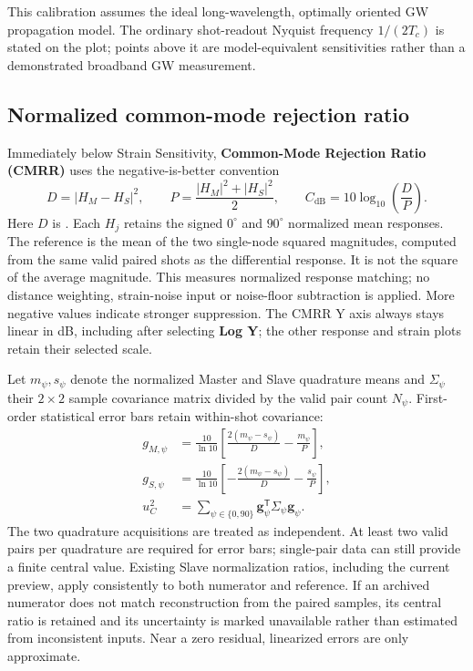 \documentclass[11pt,oneside,openany]{book}
\newcommand{\code}[1]{\texttt{\detokenize{#1}}}
\newcommand{\ui}[1]{\textbf{#1}}
\begin{document}
This calibration assumes the ideal long-wavelength, optimally oriented GW propagation
model. The ordinary shot-readout Nyquist frequency $1/(2T_c)$ is stated on the plot;
points above it are model-equivalent sensitivities rather than a demonstrated broadband
GW measurement.

\subsection{Normalized common-mode rejection ratio}
Immediately below Strain Sensitivity, \ui{Common-Mode Rejection Ratio (CMRR)} uses
the negative-is-better convention
\begin{equation}
 D=|H_M-H_S|^2,\qquad
 P=\frac{|H_M|^2+|H_S|^2}{2},\qquad
 C_{\mathrm{dB}}=10\log_{10}\!\left(\frac{D}{P}\right).
\end{equation}
Here $D$ is \code{differential_s2}. Each $H_j$ retains the signed $0^\circ$ and $90^\circ$ normalized mean responses.
The reference is the mean of the two single-node squared magnitudes, computed
from the same valid paired shots as the differential response. It is not the square
of the average magnitude. This measures normalized response matching; no distance
weighting, strain-noise input or noise-floor subtraction is applied. More negative
values indicate stronger suppression. The CMRR Y axis always stays linear in dB,
including after selecting \ui{Log Y}; the other response and strain plots retain
their selected scale.

Let $m_\psi,s_\psi$ denote the normalized Master and Slave quadrature means and
$\Sigma_\psi$ their $2\times2$ sample covariance matrix divided by the valid pair
count $N_\psi$. First-order statistical error bars retain within-shot covariance:
\begin{align}
 g_{M,\psi}&=\frac{10}{\ln 10}\left[\frac{2(m_\psi-s_\psi)}{D}-\frac{m_\psi}{P}\right],\\
 g_{S,\psi}&=\frac{10}{\ln 10}\left[-\frac{2(m_\psi-s_\psi)}{D}-\frac{s_\psi}{P}\right],\\
 u_C^2&=\sum_{\psi\in\{0,90\}}\boldsymbol g_\psi^{\mathsf T}
 \Sigma_\psi\boldsymbol g_\psi.
\end{align}
The two quadrature acquisitions are treated as independent. At least two valid
pairs per quadrature are required for error bars; single-pair data can still provide
a finite central value. Existing Slave normalization ratios, including the current
preview, apply consistently to both numerator and reference. If an archived
numerator does not match reconstruction from the paired samples, its central ratio
is retained and its uncertainty is marked unavailable rather than estimated from
inconsistent inputs. Near a zero residual, linearized errors are only approximate.
\end{document}
